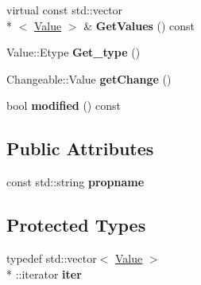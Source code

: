 \begin{DoxyCompactItemize}
\item 
\hypertarget{classProperty_af7566cb7ff5ce86bc37c53fab0c73b8e}{virtual const std\-::vector\\*
$<$ \hyperlink{classValue}{Value} $>$ \& {\bfseries Get\-Values} () const }\label{classProperty_af7566cb7ff5ce86bc37c53fab0c73b8e}

\item 
\hypertarget{classProperty_ad4dfa2bc05c8f80dc4e554fde59538a4}{Value\-::\-Etype {\bfseries Get\-\_\-type} ()}\label{classProperty_ad4dfa2bc05c8f80dc4e554fde59538a4}

\item 
\hypertarget{classProperty_af38f129e65933845e4114835b5abdcd4}{Changeable\-::\-Value {\bfseries get\-Change} ()}\label{classProperty_af38f129e65933845e4114835b5abdcd4}

\item 
\hypertarget{classProperty_a6eb065e2efbbacb73c840001ac69c056}{bool {\bfseries modified} () const }\label{classProperty_a6eb065e2efbbacb73c840001ac69c056}

\end{DoxyCompactItemize}
\subsection*{Public Attributes}
\begin{DoxyCompactItemize}
\item 
\hypertarget{classProperty_a9b1096a84a64a0595ab8d79e836d3266}{const std\-::string {\bfseries propname}}\label{classProperty_a9b1096a84a64a0595ab8d79e836d3266}

\end{DoxyCompactItemize}
\subsection*{Protected Types}
\begin{DoxyCompactItemize}
\item 
\hypertarget{classProperty_a916e46cc6991261d59af94cd70b23953}{typedef std\-::vector$<$ \hyperlink{classValue}{Value} $>$\\*
\-::iterator {\bfseries iter}}\label{classProperty_a916e46cc6991261d59af94cd70b23953}

\end{DoxyCompactItemize}
